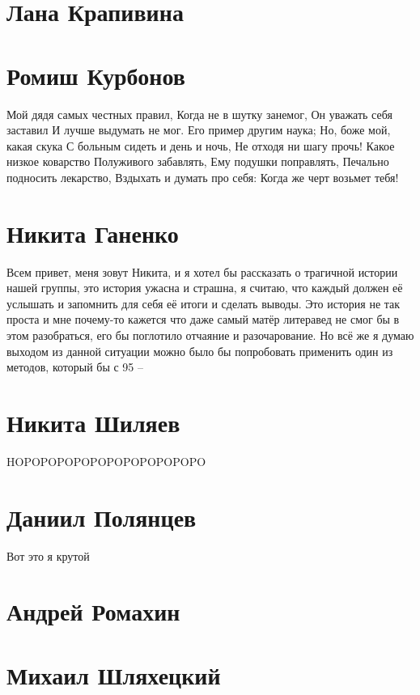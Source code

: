\documentclass{article}
\begin{document}
\section*{Лана Крапивина}

\section*{Ромиш Курбонов}

Мой дядя самых честных правил, Когда не в шутку занемог, Он уважать себя заставил И лучше выдумать не мог.
Его пример другим наука; Но, боже мой, какая скука С больным сидеть и день и ночь, Не отходя ни шагу прочь!
Какое низкое коварство Полуживого забавлять, Ему подушки поправлять, Печально подносить лекарство,
Вздыхать и думать про себя: Когда же черт возьмет тебя!

\section*{Никита Ганенко}

Всем привет, меня зовут Никита, и я хотел бы рассказать о трагичной истории нашей группы, это история ужасна и страшна, я считаю, что каждый должен её услышать и запомнить для себя её итоги и сделать выводы. Это история не так проста и мне почему-то кажется что даже самый матёр литеравед не смог бы в этом разобраться, его бы поглотило отчаяние и разочарование. Но всё же я думаю выходом из данной ситуации можно было бы попробовать применить один из методов, который бы с 95%
--
\section*{Никита Шиляев}

HOPOPOPOPOPOPOPOPOPOPOPO


\section *{Даниил Полянцев}
Вот это я крутой
\section*{Андрей Ромахин}

\section*{Михаил Шляхецкий}
\end{document}
